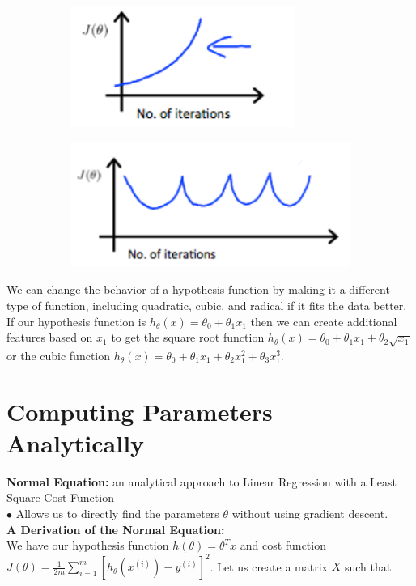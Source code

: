 \begin{figure}[hbt!]
    \centering
    \begin{subfigure}[b]{.45\linewidth}
        \includegraphics[scale=1]{Resources/Gradient_Descent_Debug}
    \end{subfigure}
    \begin{subfigure}[b]{.45\linewidth}
        \includegraphics[scale=0.8]{Resources/Gradient_Descent_Debug2}
    \end{subfigure}
\end{figure}

\noindent We can change the behavior of a hypothesis function by making it a different type of
function, including quadratic, cubic, and radical if it fits the data better. If our hypothesis
function is $h_\theta (x)=\theta_0+\theta_1 x_1$ then we can create additional features based on $x_1$
to get the square root function $h_\theta(x)=\theta_0 +\theta_1 x_1+\theta_2\sqrt{x_1}$ or the cubic
function $h_\theta(x)=\theta_0 + \theta_1 x_1 + \theta_2 x_1^2 + \theta_3 x_1^3$.



\pagebreak
\section{Computing Parameters Analytically}
\textbf{Normal Equation:} an analytical approach to Linear Regression with a Least Square Cost Function \\
$\bullet$ Allows us to directly find the parameters $\theta$ without using gradient descent. \\

\noindent \textbf{A Derivation of the Normal Equation:} \\
We have our hypothesis function $h(\theta)=\theta^T x$ and cost function $J(\theta)=\frac{1}{2m}
\sum^m_{i=1}[h_\theta (x^{(i)})-y^{(i)}]^2$. Let us create a matrix $X$ such that

